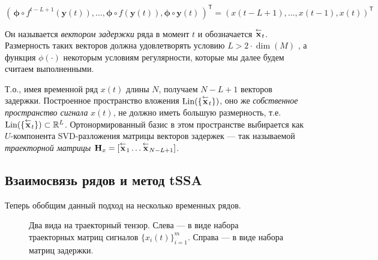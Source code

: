 		 	 \[
		 	 	( \, \boldsymbol{\phi} \circ f^{t - L + 1}(\mathbf{y}(t)), \ldots , \boldsymbol{\phi} \circ f(\mathbf{y}(t)), \boldsymbol{\phi} \circ \mathbf{y}(t) \,)^{\mathsf{T}} = (x(t - L + 1), \ldots , x(t-1), x(t))^{\mathsf{T}}
		 	 \] 
		 	 
		 	Он называется \emph{вектором задержки} ряда в момент $ t $ и обозначается $ \overset{\leftarrow}{\mathbf{x}}_{t} $. Размерность таких векторов должна удовлетворять условию $ L > 2 \cdot \dim(M) $ , а функция $ \phi(\cdot) $ некоторым условиям регулярности, которые мы далее будем считаем выполненными.
		 	
		 	Т.о., имея временной ряд $ x(t) $ длины $ N $, получаем $ N - L + 1 $ векторов задержки. Построенное пространство вложения $ \text{Lin}(\{\overset{\leftarrow}{\mathbf{x}}_{t}\}) $, оно же \emph{собственное пространство сигнала} $ x(t) $, не должно иметь большую размерность, т.е. $ \text{Lin}(\{\overset{\leftarrow}{\mathbf{x}}_{t}\}) \subset \mathbb{R}^L $. Ортонормированный базис в этом пространстве выбирается как $ U $-компонента SVD-разложения матрицы векторов задержек --- так называемой \emph{траекторной матрицы} $ \mathbf{H}_x = [ \overset{\leftarrow}{\mathbf{x}}_{1} \ldots  \overset{\leftarrow}{\mathbf{x}}_{N - L + 1}] $.
		 	
		 \subsection{Взаимосвязь рядов и метод tSSA}\label{sec:tssa_method}
		 
		 	Теперь обобщим данный подход на несколько временных рядов.
		 
		 	\begin{figure}[h]
		 		\centering
		 		
		 		\caption{Два вида на траекторный тензор. Слева --- в виде набора траекторных матриц сигналов $ \{x_i(t)\}_{i=1}^m $. Справа --- в виде набора матриц задержки.}\label{pic:traj_tensor}
		 	\end{figure}
	    

